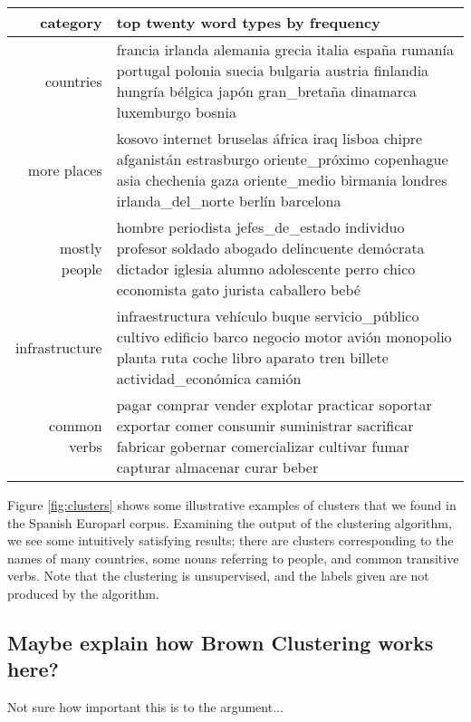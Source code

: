 \begin{figure*}[t!]
  \begin{tabular}{|r|p{10cm}|}
    \hline
    category  & top twenty word types by frequency \\
    \hline
    countries & francia irlanda alemania grecia italia españa rumanía portugal polonia suecia bulgaria austria finlandia hungría bélgica japón gran\_bretaña dinamarca luxemburgo bosnia \\
    \hline
    more places & kosovo internet bruselas áfrica iraq lisboa chipre afganistán estrasburgo oriente\_próximo copenhague asia chechenia gaza oriente\_medio birmania londres irlanda\_del\_norte berlín barcelona \\
    \hline
    mostly people & hombre periodista jefes\_de\_estado individuo profesor soldado abogado delincuente demócrata dictador iglesia alumno adolescente perro chico economista gato jurista caballero bebé \\
    \hline
    infrastructure & infraestructura vehículo buque servicio\_público cultivo edificio barco negocio motor avión monopolio planta ruta coche libro aparato tren billete actividad\_económica camión \\
    \hline
    common verbs & pagar comprar vender explotar practicar soportar exportar comer consumir suministrar sacrificar fabricar gobernar comercializar cultivar fumar capturar almacenar curar beber \\
    \hline
  \end{tabular}
\caption{Some illustrative clusters found by the Brown clustering algorithm on
the Spanish Europarl data. These are five out of $C=1000$ clusters, and
were picked and labeled by hand. The words listed are the
top twenty terms from that cluster, by frequency.}
\label{fig:clusters}
\end{figure*}

Figure \ref{fig:clusters} shows some illustrative examples of clusters that
we found in the Spanish Europarl corpus.  Examining the output of the
clustering algorithm, we see some intuitively satisfying results; there are
clusters corresponding to the names of many countries, some nouns referring to
people, and common transitive verbs. Note that the clustering is unsupervised,
and the labels given are not produced by the algorithm.

\subsection{Maybe explain how Brown Clustering works here?}
Not sure how important this is to the argument...


